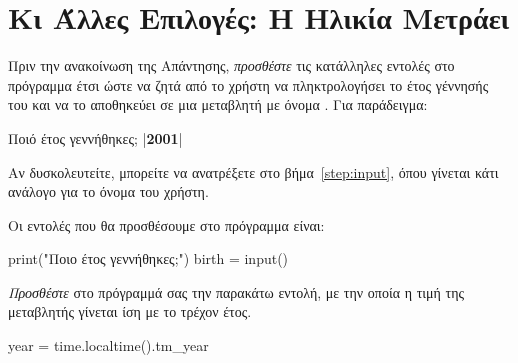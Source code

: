 \documentclass[a4paper,11pt,oneside]{book}
\begin{document}
\section{Κι Άλλες Επιλογές: Η Ηλικία Μετράει}

\begin{step}
Πριν την ανακοίνωση της Απάντησης, \emph{προσθέστε} τις κατάλληλες εντολές στο πρόγραμμα έτσι ώστε να ζητά από το χρήστη να πληκτρολογήσει το έτος γέννησής του και να το αποθηκεύει σε μια μεταβλητή με όνομα . Για παράδειγμα:

\begin{pyterm}
Ποιό έτος γεννήθηκες;
|\textbf{2001}|
\end{pyterm}

Αν δυσκολευτείτε, μπορείτε να ανατρέξετε στο βήμα~\ref{step:input}, όπου γίνεται κάτι ανάλογο για το όνομα του χρήστη.

\begin{answer}
Οι εντολές που θα προσθέσουμε στο πρόγραμμα είναι:

\begin{pynew}
print("Ποιο έτος γεννήθηκες;")
birth = input()
\end{pynew}
\end{answer}
\end{step}

\begin{step}
\emph{Προσθέστε} στο πρόγραμμά σας την παρακάτω εντολή, με την οποία η τιμή της μεταβλητής  γίνεται ίση με το τρέχον έτος.

\begin{pynew}
year = time.localtime().tm_year
\end{pynew}
\end{step}
\end{document}
